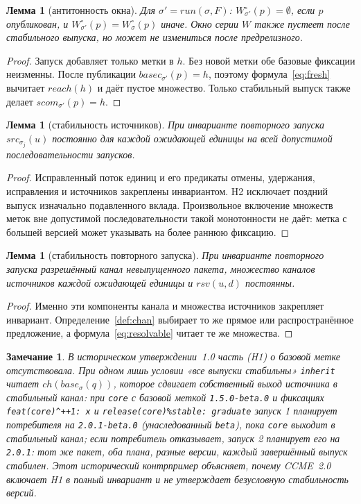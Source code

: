\documentclass[sigconf,nonacm]{acmart}
\theoremstyle{acmplain}
\newtheorem{lemma}[theorem]{Лемма}
\theoremstyle{acmdefinition}
\theoremstyle{acmplain}
\newcommand{\code}[1]{\texttt{#1}}
\newtheorem{remarknum}{Замечание}
\begin{document}
\begin{lemma}[антитонность окна]
\label{lem:w}
Для $\sigma' = \mathit{run}(\sigma,F)$: $W^\circ_{\sigma'}(p)=\emptyset$,
если $p$ опубликован, и $W^\circ_{\sigma'}(p)=W^\circ_\sigma(p)$ иначе.
Окно серии $W$ также пустеет после стабильного выпуска, но может не
измениться после предрелизного.
\end{lemma}
\begin{proof}
Запуск добавляет только метки в $h$. Без новой метки обе базовые фиксации
неизменны. После публикации $\mathit{basec}_{\sigma'}(p)=h$, поэтому
формула~\ref{eq:fresh} вычитает $\mathit{reach}(h)$ и даёт пустое множество.
Только стабильный выпуск также делает $\mathit{scom}_{\sigma'}(p)=h$.
\end{proof}

\begin{lemma}[стабильность источников]
\label{lem:s}
При инварианте повторного запуска $\mathit{src}_{\sigma_j}(u)$ постоянно
для каждой ожидающей единицы на всей допустимой последовательности запусков.
\end{lemma}
\begin{proof}
Исправленный поток единиц и его предикаты отмены, удержания, исправления и
источников закреплены инвариантом. H2 исключает поздний выпуск изначально
подавленного вклада. Произвольное включение множеств меток вне допустимой
последовательности такой монотонности не даёт: метка с большей версией может
указывать на более раннюю фиксацию.
\end{proof}

\begin{lemma}[стабильность повторного запуска]
\label{lem:c}
При инварианте повторного запуска разрешённый канал невыпущенного пакета,
множество каналов источников каждой ожидающей единицы и
$\mathit{rsv}(u,d)$ постоянны.
\end{lemma}
\begin{proof}
Именно эти компоненты канала и множества источников закрепляет инвариант.
Определение~\ref{def:chan} выбирает то же прямое или распространённое
предложение, а формула~\ref{eq:resolvable} читает те же множества.
\end{proof}

\begin{remarknum}
\label{rem:drift}
В историческом утверждении~1.0 часть (H1) о базовой метке отсутствовала.
При одном лишь условии «все выпуски
стабильны» \code{inherit} читает
$\mathit{ch}(\mathit{base}_\sigma(q))$, которое сдвигает собственный
выход источника в стабильный канал: при \code{core} с базовой меткой \code{1.5.0-beta.0} и
фиксациях \code{feat(core)\^{}++1:~x} и
\code{release(core)\%stable:~graduate} запуск 1 планирует потребителя на
\code{2.0.1-beta.0} (унаследованный \code{beta}), пока \code{core}
выходит в стабильный канал; если потребитель отказывает, запуск 2 планирует его на \code{2.0.1}:
тот же пакет, оба плана, разные версии, каждый завершённый выпуск
стабилен. Этот исторический контрпример объясняет, почему CCME~2.0 включает
H1 в полный инвариант и не утверждает безусловную стабильность версий.
\end{remarknum}
\end{document}
